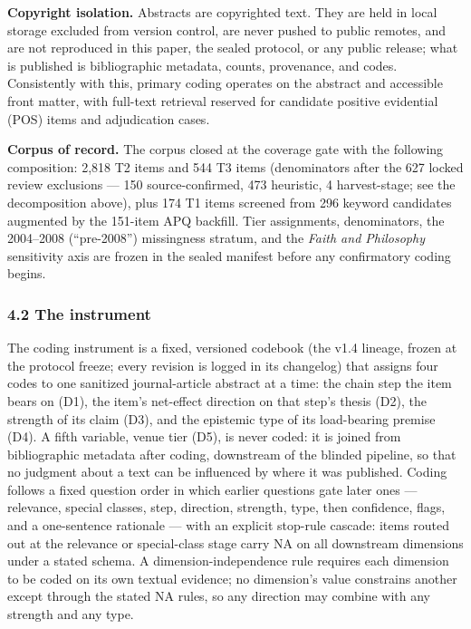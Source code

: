\textbf{Copyright isolation.} Abstracts are copyrighted text. They are held in local storage excluded from version control, are never pushed to public remotes, and are not reproduced in this paper, the sealed protocol, or any public release; what is published is bibliographic metadata, counts, provenance, and codes. Consistently with this, primary coding operates on the abstract and accessible front matter, with full-text retrieval reserved for candidate positive evidential (POS) items and adjudication cases.

\textbf{Corpus of record.} The corpus closed at the coverage gate with the following composition: 2,818 T2 items and 544 T3 items (denominators after the 627 locked review exclusions --- 150 source-confirmed, 473 heuristic, 4 harvest-stage; see the decomposition above), plus 174 T1 items screened from 296 keyword candidates augmented by the 151-item APQ backfill. Tier assignments, denominators, the 2004--2008 (``pre-2008'') missingness stratum, and the \emph{Faith and Philosophy} sensitivity axis are frozen in the sealed manifest before any confirmatory coding begins.

\subsubsection{4.2 The instrument}\label{the-instrument}

The coding instrument is a fixed, versioned codebook (the v1.4 lineage, frozen at the protocol freeze; every revision is logged in its changelog) that assigns four codes to one sanitized journal-article abstract at a time: the chain step the item bears on (D1), the item's net-effect direction on that step's thesis (D2), the strength of its claim (D3), and the epistemic type of its load-bearing premise (D4). A fifth variable, venue tier (D5), is never coded: it is joined from bibliographic metadata after coding, downstream of the blinded pipeline, so that no judgment about a text can be influenced by where it was published. Coding follows a fixed question order in which earlier questions gate later ones --- relevance, special classes, step, direction, strength, type, then confidence, flags, and a one-sentence rationale --- with an explicit stop-rule cascade: items routed out at the relevance or special-class stage carry NA on all downstream dimensions under a stated schema. A dimension-independence rule requires each dimension to be coded on its own textual evidence; no dimension's value constrains another except through the stated NA rules, so any direction may combine with any strength and any type.


